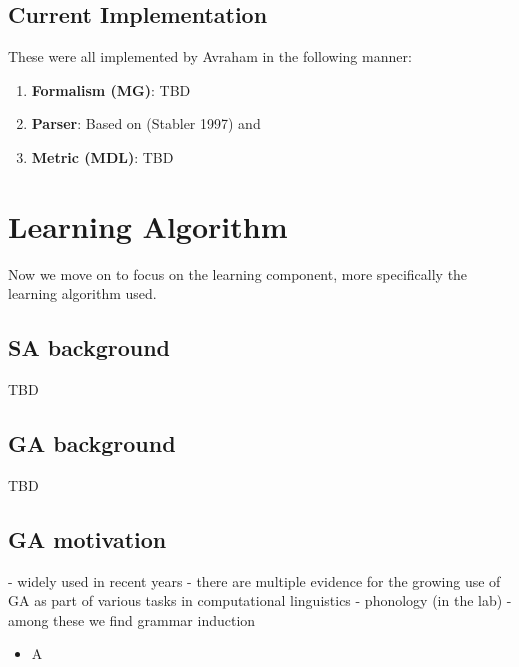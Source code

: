 \documentclass{article}
\begin{document}
\subsection{Current Implementation} 
These were all implemented by Avraham in the following manner:
\begin{enumerate}
  \item \textbf{Formalism (MG)}: TBD
  \item \textbf{Parser}: Based on (Stabler 1997) and 
  \item \textbf{Metric (MDL)}: TBD
\end{enumerate}

\clearpage
\section{Learning Algorithm} 
Now we move on to focus on the learning component, more specifically the learning algorithm used.

\subsection{SA background} %
TBD
\subsection{GA background} %
TBD
\subsection{GA motivation} %
- widely used in recent years
- there are multiple evidence for the growing use of GA as part of various tasks in computational linguistics
- phonology (in the lab)
- among these we find grammar induction




\begin{itemize}
  \item A
\end{itemize}
\end{document}
